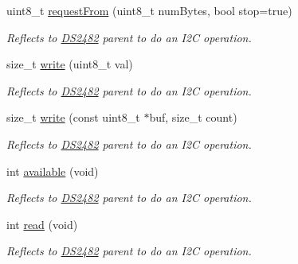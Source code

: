 \begin{DoxyCompactItemize}
uint8\+\_\+t \mbox{\hyperlink{class_d_s2482_command_a968712d6c1e7386f8e4c07fae845d407}{request\+From}} (uint8\+\_\+t num\+Bytes, bool stop=true)
\begin{DoxyCompactList}\small\item\em Reflects to \mbox{\hyperlink{class_d_s2482}{D\+S2482}} parent to do an I2C operation. \end{DoxyCompactList}\item 
\mbox{\label{class_d_s2482_command_ae8f1c3c34aaead3bd32f2b7a554d9d9e}} 
size\+\_\+t \mbox{\hyperlink{class_d_s2482_command_ae8f1c3c34aaead3bd32f2b7a554d9d9e}{write}} (uint8\+\_\+t val)
\begin{DoxyCompactList}\small\item\em Reflects to \mbox{\hyperlink{class_d_s2482}{D\+S2482}} parent to do an I2C operation. \end{DoxyCompactList}\item 
\mbox{\label{class_d_s2482_command_a2945b8e699ca9966466e7b63202b33f8}} 
size\+\_\+t \mbox{\hyperlink{class_d_s2482_command_a2945b8e699ca9966466e7b63202b33f8}{write}} (const uint8\+\_\+t $\ast$buf, size\+\_\+t count)
\begin{DoxyCompactList}\small\item\em Reflects to \mbox{\hyperlink{class_d_s2482}{D\+S2482}} parent to do an I2C operation. \end{DoxyCompactList}\item 
\mbox{\label{class_d_s2482_command_aeb42b6aa9d1fc73ab53aa039bcaeb949}} 
int \mbox{\hyperlink{class_d_s2482_command_aeb42b6aa9d1fc73ab53aa039bcaeb949}{available}} (void)
\begin{DoxyCompactList}\small\item\em Reflects to \mbox{\hyperlink{class_d_s2482}{D\+S2482}} parent to do an I2C operation. \end{DoxyCompactList}\item 
\mbox{\label{class_d_s2482_command_aacf56d7b84baad5e63053fc255e76397}} 
int \mbox{\hyperlink{class_d_s2482_command_aacf56d7b84baad5e63053fc255e76397}{read}} (void)
\begin{DoxyCompactList}\small\item\em Reflects to \mbox{\hyperlink{class_d_s2482}{D\+S2482}} parent to do an I2C operation. \end{DoxyCompactList}\end{DoxyCompactItemize}
